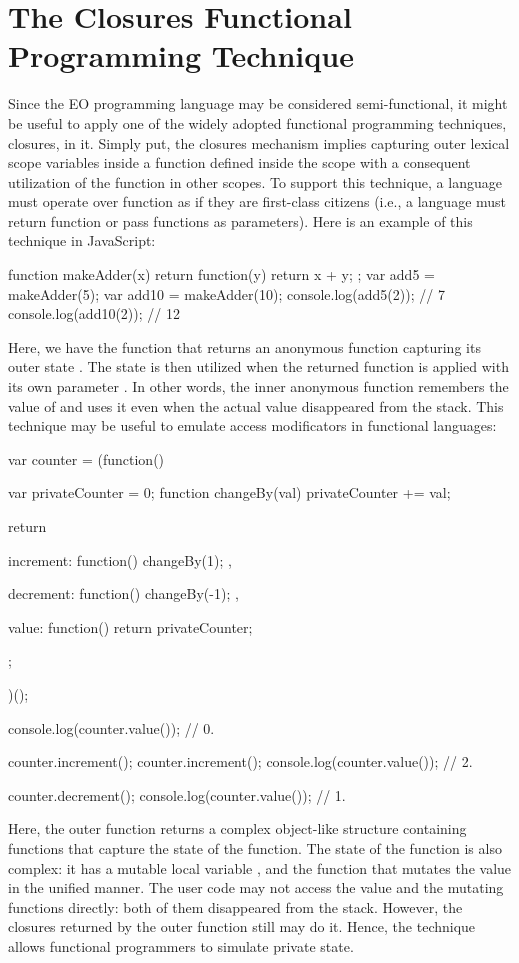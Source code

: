 \documentclass[12pt]{book}
\begin{document}
{{\section{The Closures Functional Programming Technique}
Since the EO programming language may be considered semi-functional, it might be useful to apply one of the widely adopted functional programming techniques, closures, in it. Simply put, the closures mechanism implies capturing outer lexical scope variables inside a function defined inside the scope with a consequent utilization of the function in other scopes. To support this technique, a language must operate over function as if they are first-class citizens (i.e., a language must return function or pass functions as parameters). Here is an example of this technique in JavaScript:

\begin{ffcode}
function makeAdder(x) {
  return function(y) {
    return x + y;
  };
}
var add5 = makeAdder(5);
var add10 = makeAdder(10);
console.log(add5(2));  // 7
console.log(add10(2)); // 12
\end{ffcode}

Here, we have the  function that returns an anonymous function capturing its outer state . The state is then utilized when the returned function is applied with its own parameter . In other words, the inner anonymous function remembers the value of  and uses it even when the actual value disappeared from the stack. This technique may be useful to emulate access modificators in functional languages: 

\begin{ffcode}
var counter = (function() {
  var privateCounter = 0;
  function changeBy(val) {
    privateCounter += val;
  }

  return {
    increment: function() {
      changeBy(1);
    },

    decrement: function() {
      changeBy(-1);
    },

    value: function() {
      return privateCounter;
    }
  };
})();

console.log(counter.value());  // 0.

counter.increment();
counter.increment();
console.log(counter.value());  // 2.

counter.decrement();
console.log(counter.value());  // 1.
\end{ffcode}

Here, the outer function  returns a complex object-like structure containing functions that capture the state of the  function. The state of the  function is also complex: it has a mutable local variable , and the  function that mutates the value in the unified manner. The user code may not access the value and the mutating functions directly: both of them disappeared from the stack. However, the closures returned by the outer function still may do it. Hence, the technique allows functional programmers to simulate private state. 

}}
\end{document}

